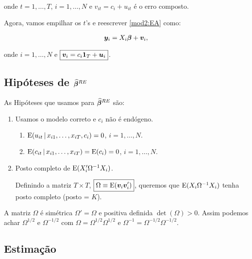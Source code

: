\documentclass[11pt, oneside, a4paper, article]{article}
\numberwithin{equation}{section}
\begin{document}
\noindent
onde
$t = 1, \dots, T$, $i = 1, \dots, N$ e $\boxed{v_{it} = c_{i} + u_{it}}$ é o erro composto.

Agora, vamos empilhar os $t$'s e reescrever \eqref{mod2:EA} como:

\vspace{-1 em}
\begin{align} \label{mod3:EA}
	\boldsymbol{y}_{i} = X_{i} \boldsymbol{\beta} + \boldsymbol{v}_{i},
\end{align}

\noindent
onde
$i = 1, \dots, N$ e $\boxed{\boldsymbol{v}_{i} = c_{i} \boldsymbol{1}_{T} + \boldsymbol{u}_{i}}$.

\subsection*{Hipóteses de $\boldsymbol{\widehat{\beta}}^{RE}$}

As Hipóteses que usamos para $\boldsymbol{\widehat{\beta}}^{RE}$ são:

\begin{enumerate} \itemsep0pt
\item  
Usamos o modelo correto e $c_{i}$ não é endógeno.

\begin{enumerate}[label =\alph*)]
\item 
	$\text{E}( u_{it} \, | \,  x_{i1}, \dots, x_{iT}, c_{i} ) = 0$,
	$i = 1, \dots, N$.
\item        
	$\text{E}( c_{it} \, | \, x_{i1}, \dots, x_{iT} ) = \text{E}( c_{i} ) = 0$,
	$i = 1, \dots, N$.
\end{enumerate}

\item  Posto completo de $\text{E}( X_{i}' \Omega^{-1} X_{i} )$.

Definindo a matriz $T \times T$, $\boxed{\Omega \equiv \text{E}(\boldsymbol{v}_{i} \boldsymbol{v}_{i}')}$, queremos que $\text{E}( X_{i} \Omega^{-1} X_{i} )$ tenha posto completo (posto = $K$).
\end{enumerate}

A matriz $\Omega$ é simétrica $\Omega' = \Omega$ e positiva definida $\det(\Omega) > 0$.
Assim podemos achar $\Omega^{1/2}$ e $\Omega^{-1/2}$ com $\Omega = \Omega^{1/2} \Omega^{1/2}$ e $\Omega^{-1} = \Omega^{-1/2} \Omega^{-1/2}$.

\subsection*{Estimação}
\end{document}
